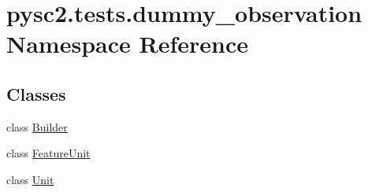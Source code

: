 \hypertarget{namespacepysc2_1_1tests_1_1dummy__observation}{}\section{pysc2.\+tests.\+dummy\+\_\+observation Namespace Reference}
\label{namespacepysc2_1_1tests_1_1dummy__observation}
\subsection*{Classes}
\begin{DoxyCompactItemize}
\item 
class \mbox{\hyperlink{classpysc2_1_1tests_1_1dummy__observation_1_1_builder}{Builder}}
\item 
class \mbox{\hyperlink{classpysc2_1_1tests_1_1dummy__observation_1_1_feature_unit}{Feature\+Unit}}
\item 
class \mbox{\hyperlink{classpysc2_1_1tests_1_1dummy__observation_1_1_unit}{Unit}}
\end{DoxyCompactItemize}
